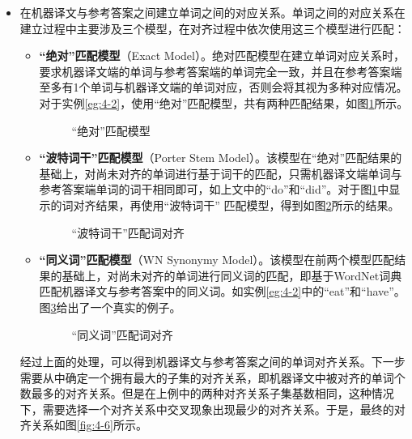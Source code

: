 \begin{itemize}
\vspace{0.5em}
\item 在机器译文与参考答案之间建立单词之间的对应关系。单词之间的对应关系在建立过程中主要涉及三个模型，在对齐过程中依次使用这三个模型进行匹配：
    \begin{itemize}
    \item {\small\sffamily\bfseries{“绝对”匹配模型}}（Exact Model）。绝对匹配模型在建立单词对应关系时，要求机器译文端的单词与参考答案端的单词完全一致，并且在参考答案端至多有1个单词与机器译文端的单词对应，否则会将其视为多种对应情况。对于实例\ref{eg:4-2}，使用“绝对”匹配模型，共有两种匹配结果，如图\ref{fig:4-3}所示。

\begin{figure}[htp]
    \centering
   \caption{“绝对”匹配模型}
   \label{fig:4-3}
\end{figure}
    \item  {\small\sffamily\bfseries{“波特词干”匹配模型}}（Porter Stem Model）。该模型在“绝对”匹配结果的基础上，对尚未对齐的单词进行基于词干的匹配，只需机器译文端单词与参考答案端单词的词干相同即可，如上文中的“do”和“did”。对于图\ref{fig:4-3}中显示的词对齐结果，再使用“波特词干” 匹配模型，得到如图\ref{fig:4-4}所示的结果。

\begin{figure}[htp]
    \centering
	
    \caption{“波特词干”匹配词对齐}
    \label{fig:4-4}
\end{figure}
    \item {\small\sffamily\bfseries{“同义词”匹配模型}}（WN Synonymy Model）。该模型在前两个模型匹配结果的基础上，对尚未对齐的单词进行同义词的匹配，即基于WordNet词典匹配机器译文与参考答案中的同义词。如实例\ref{eg:4-2}中的“eat”和“have”。图\ref{fig:4-5}给出了一个真实的例子。

\begin{figure}[htp]
    \centering
    
    \caption{“同义词”匹配词对齐}
    \label{fig:4-5}
\end{figure}
    \end{itemize}
经过上面的处理，可以得到机器译文与参考答案之间的单词对齐关系。下一步需要从中确定一个拥有最大的子集的对齐关系，即机器译文中被对齐的单词个数最多的对齐关系。但是在上例中的两种对齐关系子集基数相同，这种情况下，需要选择一个对齐关系中交叉现象出现最少的对齐关系。于是，最终的对齐关系如图\ref{fig:4-6}所示。


\end{itemize}
